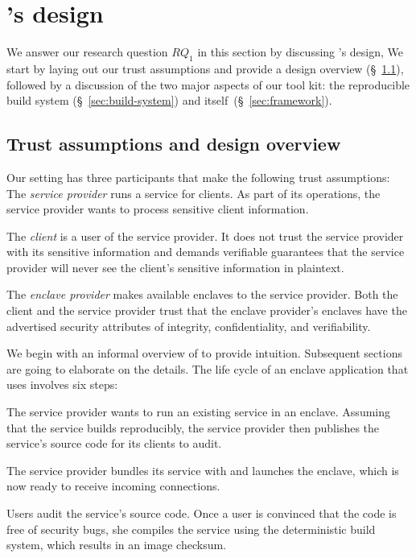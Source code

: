 \section{\Tool{}'s design}%
\label{sec:design}

We answer our research question $RQ_1$ in this section by discussing
\tool{}'s design,   We start by laying out our trust assumptions
and provide a design overview (\S~\ref{sec:assumptions-overview}), followed by a
discussion of the two major aspects of our tool kit: the reproducible build
system (\S~\ref{sec:build-system}) and \tool{} itself~(\S~\ref{sec:framework}).

\subsection{Trust assumptions and design overview}%
\label{sec:assumptions-overview}

Our setting has three participants that make the following trust assumptions:
%
The \emph{service provider} runs a service for clients.  As part of its
operations, the service provider wants to process sensitive client information.

The \emph{client} is a user of the service provider.  It does not trust the
service provider with its sensitive information and demands verifiable
guarantees that the service provider will never see the client's sensitive
information in plaintext.

The \emph{enclave provider} makes available enclaves to the service provider.
Both the client and the service provider trust that the enclave provider's
enclaves have the advertised security attributes of integrity, confidentiality,
and verifiability.

We begin with an informal overview of \tool{} to provide intuition.  Subsequent
sections are going to elaborate on the details.  The life cycle of an enclave
application that uses \tool{} involves six steps:

 The service provider wants to run an existing service in an enclave.
Assuming that the service builds reproducibly, the service provider then
publishes the service's source code for its clients to audit.

 The service provider bundles its service with \tool{} and launches
the enclave, which is now ready to receive incoming connections.

 Users audit the service's source code.  Once a user is convinced that
the code is free of security bugs, she compiles the service using the
deterministic build system, which results in an image checksum.

